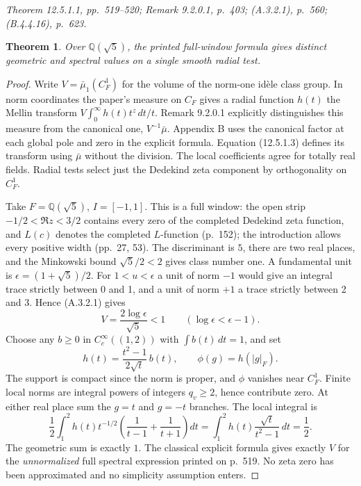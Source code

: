 \documentclass[11pt,reqno]{amsart}
\newtheorem{theorem}{Theorem}[section]
\numberwithin{equation}{section}
\newcommand{\Q}{\mathbb Q}\newcommand{\R}{\mathbb R}\newcommand{\C}{\mathbb C}\newcommand{\Z}{\mathbb Z}
\begin{document}
\textit{Theorem 12.5.1.1, pp.~519--520; Remark 9.2.0.1, p.~403; (A.3.2.1), p.~560; (B.4.4.16), p.~623.}\par
\begin{theorem}Over \(\Q(\sqrt5)\), the printed full-window formula gives distinct geometric and spectral values on a single smooth radial test.\end{theorem}\begin{proof}
Write \(V=\bar\mu_1(C_F^1)\) for the volume of the norm-one idèle class group. In norm coordinates the paper's measure on \(C_F\) gives a radial function \(h(t)\) the Mellin transform \(V\int_0^\infty h(t)t^z\,dt/t\). Remark 9.2.0.1 explicitly distinguishes this measure from the canonical one, \(V^{-1}\bar\mu\). Appendix B uses the canonical factor at each global pole and zero in the explicit formula. Equation (12.5.1.3) defines its transform using \(\bar\mu\) without the division. The local coefficients agree for totally real fields. Radial tests select just the Dedekind zeta component by orthogonality on \(C_F^1\).

Take \(F=\Q(\sqrt5)\), \(I=[-1,1]\). This is a full window: the open strip \(-1/2<\Re z<3/2\) contains every zero of the completed Dedekind zeta function, and \(L(c)\) denotes the completed \(L\)-function (p.~152); the introduction allows every positive width (pp.~27, 53). The discriminant is \(5\), there are two real places, and the Minkowski bound \(\sqrt5/2<2\) gives class number one. A fundamental unit is \(\epsilon=(1+\sqrt5)/2\). For \(1<u<\epsilon\) a unit of norm \(-1\) would give an integral trace strictly between 0 and 1, and a unit of norm \(+1\) a trace strictly between 2 and 3. Hence (A.3.2.1) gives
\[
       V=\frac{2\log\epsilon}{\sqrt5}<1
       \qquad (\log\epsilon<\epsilon-1).
\]
Choose any \(b\ge0\) in \(C_c^\infty((1,2))\) with \(\int b(t)\,dt=1\), and set
\[
 h(t)=\frac{t^2-1}{2\sqrt t}\,b(t),\qquad \phi(g)=h(|g|_F).
\]
The support is compact since the norm is proper, and \(\phi\) vanishes near \(C_F^1\). Finite local norms are integral powers of integers \(q_v\ge2\), hence contribute zero. At either real place sum the \(g=t\) and \(g=-t\) branches. The local integral is
\[
 \frac12\int_1^2h(t)t^{-1/2}\left(\frac1{t-1}+\frac1{t+1}\right)dt
 =\int_1^2h(t)\frac{\sqrt t}{t^2-1}\,dt=\frac12 .
\]
The geometric sum is exactly \(1\). The classical explicit formula gives exactly \(V\) for the \emph{unnormalized} full spectral expression printed on p.~519. No zeta zero has been approximated and no simplicity assumption enters.

\end{proof}
\end{document}
